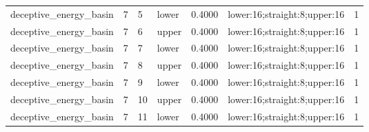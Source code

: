 \documentclass{article}
\begin{document}
\begin{table}[tbp]
{\begin{tabular}{lllllll}
deceptive\_energy\_basin & 7 & 5 & lower & 0.4000 & lower:16;straight:8;upper:16 & 1 \\
deceptive\_energy\_basin & 7 & 6 & upper & 0.4000 & lower:16;straight:8;upper:16 & 1 \\
deceptive\_energy\_basin & 7 & 7 & lower & 0.4000 & lower:16;straight:8;upper:16 & 1 \\
deceptive\_energy\_basin & 7 & 8 & upper & 0.4000 & lower:16;straight:8;upper:16 & 1 \\
deceptive\_energy\_basin & 7 & 9 & lower & 0.4000 & lower:16;straight:8;upper:16 & 1 \\
deceptive\_energy\_basin & 7 & 10 & upper & 0.4000 & lower:16;straight:8;upper:16 & 1 \\
deceptive\_energy\_basin & 7 & 11 & lower & 0.4000 & lower:16;straight:8;upper:16 & 1 \\
\bottomrule
\end{tabular}
}
\end{table}

\clearpage
\end{document}
